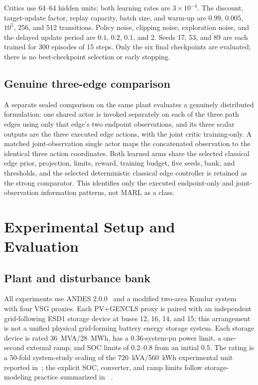 \documentclass[conference,a4paper]{IEEEtran}
\begin{document}
Critics use 64--64 hidden units; both learning rates are
\(3\times10^{-4}\). The discount, target-update factor, replay capacity,
batch size, and warm-up are \(0.99\), \(0.005\), \(10^5\), 256, and 512
transitions. Policy noise, clipping noise, exploration noise, and the delayed
update period are \(0.1\), \(0.2\), \(0.1\), and 2. Seeds 17, 53, and 89 are
each trained for 300 episodes of 15 steps. Only the six final checkpoints are
evaluated; there is no best-checkpoint selection or early stopping.

\subsection{Genuine three-edge comparison}

A separate sealed comparison on the same plant evaluates a genuinely
distributed formulation: one shared actor is invoked separately on each of
the three path edges using only that edge's two endpoint observations, and
its three scalar outputs are the three executed edge actions, with the joint
critic training-only. A matched joint-observation single actor maps the
concatenated observation to the identical three action coordinates. Both
learned arms share the selected classical edge prior, projection, limits,
reward, training budget, five seeds, bank, and thresholds, and the selected
deterministic classical edge controller is retained as the strong comparator.
This identifies only the executed endpoint-only and joint-observation
information patterns, not MARL as a class.

\section{Experimental Setup and Evaluation}

\subsection{Plant and disturbance bank}

All experiments use ANDES 2.0.0~\cite{cui2021andes} and a modified two-area
Kundur system~\cite{kundur1994} with four VSG proxies. Each PV+GENCLS proxy is
paired with an independent grid-following ESD1 storage device at buses 12, 16,
14, and 15; this arrangement is not a unified physical grid-forming battery
energy storage system. Each storage device is rated
\SI{36}{MVA}/\SI{28}{MWh}, has a 0.36-system-pu power limit, a one-second
external ramp, and SOC limits of 0.2--0.8 from an initial 0.5. The rating is a
50-fold system-study scaling of the \SI{720}{kVA}/\SI{560}{kWh} experimental
unit reported in~\cite{gerini2022gfm}; the explicit SOC, converter, and ramp
limits follow storage-modeling practice summarized in
~\cite{wecc2016bess}.
\end{document}

